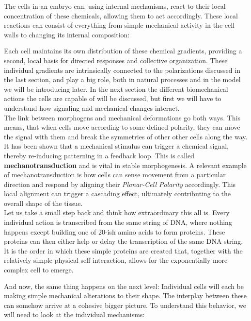 The cells in an embryo can, using internal mechanisms, react to their local concentration of these chemicals, allowing them to act accordingly. These local reactions can consist of everything from simple mechanical activity in the cell walls to changing its internal composition:

Each cell maintains its own distribution of these chemical gradients, providing a second, local basis for directed responses and collective organization. These individual gradients are intrinsically connected to the polarizations discussed in the last section, and play a big role, both in natural processes and in the model we will be introducing later. In the next section the different biomechanical actions the cells are capable of will be discussed, but first we will have to understand how signaling and mechanical changes interact.\\

The link between morphogens and mechanical deformations go both ways. This means, that when cells move according to some defined polarity, they can move the signal with them and break the symmetries of other other cells along the way. It has been shown that a mechanical stimulus can trigger a chemical signal, thereby re-inducing patterning in a feedback loop. This is called \textbf{mechanotransduction} and is vital in stable morphogenesis\cite{bidhendi2019mechanical}. A relevant example of mechanotransduction is how cells can sense movement from a particular direction and respond by aligning their \textit{Planar-Cell Polarity} accordingly.\cite{gray2011planar} This local alignment can trigger a cascading effect, ultimately contributing to the overall shape of the tissue.\\


Let us take a small step back and think how extraordinary this all is. Every individual action is transcribed from the same string of DNA, where nothing happens except building one of 20-ish amino acids to form proteins. These proteins can then either help or delay the transcription of the same DNA string. It is the order in which these simple proteins are created that, together with the relatively simple physical self-interaction, allows for the exponentially more complex cell to emerge.


And now, the same thing happens on the next level: Individual cells will each be making simple mechanical alterations to their shape. The interplay between these can somehow arrive at a cohesive bigger picture. To understand this behavior, we will need to look at the individual mechanisms:


